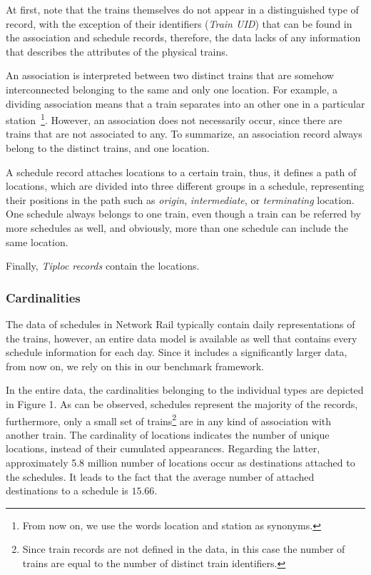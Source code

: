 At first, note that the trains themselves do not appear in a distinguished type of record, with the exception of their identifiers (\textit{Train UID}) that can be found in the association and schedule records, therefore, the data lacks of any information that describes the attributes of the physical trains.

An association is interpreted between two distinct trains that are somehow interconnected belonging to the same and only one location. For example, a dividing association means that a train separates into an other one in a particular station~\footnote{From now on, we use the words location and station as synonyms.}. However, an association does not necessarily occur, since there are trains that are not associated to any. To summarize, an association record always belong to the distinct trains, and one location.

A schedule record attaches locations to a certain train, thus, it defines a path of locations, which are divided into three different groups in a schedule, representing their positions in the path such as \textit{origin}, \textit{intermediate}, or \textit{terminating} location. One schedule always belongs to one train, even though a train can be referred by more schedules as well, and obviously, more than one schedule can include the same location.

Finally, \textit{Tiploc records} contain the locations.

\subsubsection{Cardinalities}

The data of schedules in Network Rail typically contain daily representations of the trains, however, an entire data model is available as well that contains every schedule information for each day. Since it includes a significantly larger data, from now on, we rely on this in our benchmark framework.

In the entire data, the cardinalities belonging to the individual types are depicted in Figure 1. %
As can be observed, schedules represent the majority of the records, furthermore, only a small set of trains\footnote{Since train records are not defined in the data, in this case the number of trains are equal to the number of distinct train identifiers.} are in any kind of association with another train. The cardinality of locations indicates the number of unique locations, instead of their cumulated appearances. Regarding the latter, approximately 5.8 million number of locations occur as destinations attached to the schedules. It leads to the fact that the average number of attached destinations to a schedule is $15.66$.

